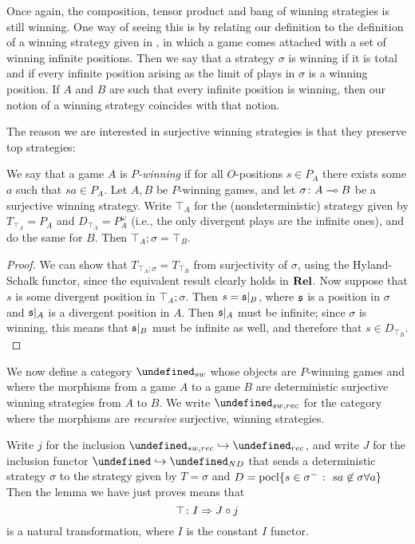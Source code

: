 \documentclass[sigplan,10pt,review]{acmart}\settopmatter{printfolios=true,printccs=false,printacmref=false}
\let\G\undefined
\begin{document}
Once again, the composition, tensor product and bang of winning strategies is still winning.  
One way of seeing this is by relating our definition to the definition of a winning strategy given in \cite{abramskyjagadeesangames}, in which a game comes attached with a set of winning infinite positions.  
Then we say that a strategy $\sigma$ is winning if it is total and if every infinite position arising as the limit of plays in $\sigma$ is a winning position.  
If $A$ and $B$ are such that every infinite position is winning, then our notion of a winning strategy coincides with that notion.  

The reason we are interested in surjective winning strategies is that they preserve top strategies:

\begin{lemma}
  We say that a game $A$ is \emph{$P$-winning} if for all $O$-positions $s\in P_A$ there exists some $a$ such that $sa\in P_A$.  
  Let $A,B$ be $P$-winning games, and let $\sigma\colon A\multimap B$ be a surjective winning strategy.  
  Write $\top_A$ for the (nondeterministic) strategy given by $T_{\top_A}=P_A$ and $D_{\top_A}=P_A^\omega$ (i.e., the only divergent plays are the infinite ones), and do the same for $B$.
  Then $\top_A;\sigma=\top_B$.  
\end{lemma}
\begin{proof}
  We can show that $T_{\top_A;\sigma}=T_{\top_B}$ from surjectivity of $\sigma$, using the Hyland-Schalk functor, since the equivalent result clearly holds in ${\normalfont\textbf{Rel}}$.  
  Now suppose that $s$ is some divergent position in $\top_A;\sigma$.  
  Then $s=\mathfrak s\vert_B$, where $\mathfrak s$ is a position in $\sigma$ and $\mathfrak s\vert_A$ is a divergent position in $A$.
  Then $\mathfrak s\vert_A$ must be infinite; since $\sigma$ is winning, this means that $\mathfrak s\vert_B$ must be infinite as well, and therefore that $s\in D_{\top_B}$.  
  \label{lem:sw}
\end{proof}

We now define a category $\G_{sw}$ whose objects are $P$-winning games and where the morphisms from a game $A$ to a game $B$ are deterministic surjective winning strategies from $A$ to $B$.  
We write $\G_{sw,rec}$ for the category where the morphisms are \emph{recursive} surjective, winning strategies.  

Write $j$ for the inclusion $\G_{sw,rec}\hookrightarrow\G_{rec}$, and write $J$ for the inclusion functor $\G\hookrightarrow\G_{ND}$ that sends a deterministic strategy $\sigma$ to the strategy given by $T=\sigma$ and $D=\operatorname{pocl}\{s\in\sigma^-\;\colon\; sa\not\in\sigma\forall a\}$
Then the lemma we have just proves means that
\[
  \top \colon I \Rightarrow J\circ j
  \]
is a natural transformation, where $I$ is the constant $I$ functor.
\end{document}
